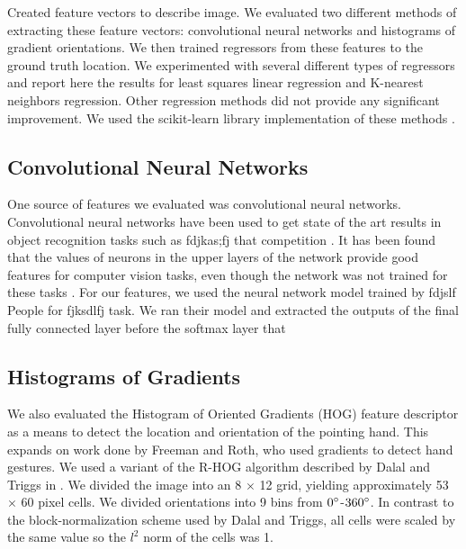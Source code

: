 \documentclass[10pt,twocolumn,letterpaper]{article}
\begin{document}
Created feature vectors to describe image.  We evaluated two different methods of extracting these feature vectors: convolutional neural networks and histograms of gradient orientations.  We then trained regressors from these features to the ground truth location.  We experimented with several different types of regressors and report here the results for least squares linear regression and K-nearest neighbors regression.  Other regression methods did not provide any significant improvement.  We used the scikit-learn library implementation of these methods \cite{scikit-learn}.

\subsection{Convolutional Neural Networks}

One source of features we evaluated was convolutional neural networks.  Convolutional neural networks have been used to get state of the art results in object recognition tasks such as fdjkas;fj that competition \cite{something}.  It has been found that the values of neurons in the upper layers of the network provide good features for computer vision tasks, even though the network was not trained for these tasks \cite{something}.  For our features, we used the neural network model trained by fdjslf People for fjksdlfj task.  \cite{jia2014caffe}  We ran their model and extracted the outputs of the final fully connected layer before the softmax layer that 

\subsection{Histograms of Gradients}

We also evaluated the Histogram of Oriented Gradients (HOG) feature descriptor \cite{dalal2005histograms} as a means to detect the location and orientation of the pointing hand. This expands on work done by Freeman and Roth, who used gradients to detect hand gestures. We used a variant of the R-HOG algorithm described by Dalal and Triggs in \cite{dalal2005histograms}. We divided the image into an 8 $\times$ 12 grid, yielding approximately 53 $\times$ 60 pixel cells. We divided orientations into 9 bins from $0\degree$-$360\degree$. In contrast to the block-normalization scheme used by Dalal and Triggs, all cells were scaled by the same value so the $l^2$ norm of the cells was 1.

\end{document}
